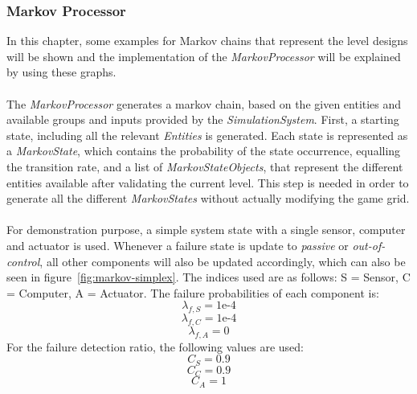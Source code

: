 \subsubsection{Markov Processor}\label{subsubsec:example-markov-chains}
In this chapter, some examples for Markov chains that represent the level designs will be shown and the implementation of the
\textit{MarkovProcessor} will be explained by using these graphs.
\\ \\
The \textit{MarkovProcessor} generates a markov chain, based on the given entities and available groups and inputs provided by the \textit{SimulationSystem}.
First, a starting state, including all the relevant \textit{Entities} is generated.
Each state is represented as a \textit{MarkovState}, which contains the probability of the state occurrence, equalling the
transition rate, and a list of \textit{MarkovStateObjects},
that represent the different entities available after validating
the current level.
This step is needed in order to generate all the different \textit{MarkovStates} without actually modifying the game grid.
\\ \\
For demonstration purpose, a simple system state with a single sensor, computer and actuator is used.
Whenever a failure state is update to \textit{passive} or \textit{out-of-control}, all other components will also be updated accordingly,
which can also be seen in figure~\ref{fig:markov-simplex}.
The indices used are as follows: S = Sensor, C = Computer, A = Actuator.
The failure probabilities of each component is:
\begin{equation}
    \lambda_{f,S} = 1\text{e-}4
    \label{eq:markov-1}
\end{equation}
\begin{equation}
    \lambda_{f,C} = 1\text{e-}4
    \label{eq:markov-2}
\end{equation}
\begin{equation}
    \lambda_{f,A} = 0
    \label{eq:markov-3}
\end{equation}
For the failure detection ratio, the following values are used:
\begin{equation}
    C_{S} = 0.9
    \label{eq:markov-4}
\end{equation}
\begin{equation}
    C_{C} = 0.9
    \label{eq:markov-5}
\end{equation}
\begin{equation}
    C_{A} = 1
    \label{eq:markov-6}
\end{equation}

